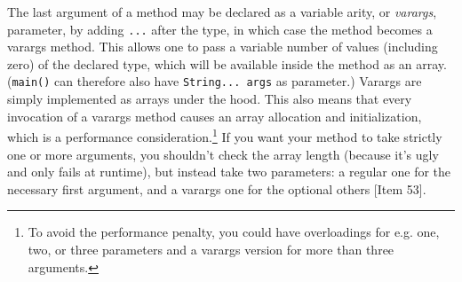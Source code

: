 \documentclass[8pt, table, xcdraw]{article}%
\begin{document}
The last argument of a method may be declared as a variable arity, or \emph{varargs}, parameter, by adding \lstinline{...} after the type, in which case the method becomes a varargs method. This allows one to pass a variable number of values (including zero) of the declared type, which will be available inside the method as an array. (\lstinline{main()} can therefore also have \lstinline{String... args} as parameter.) Varargs are simply implemented as arrays under the hood. This also means that every invocation of a varargs method causes an array allocation and initialization, which is a performance consideration.\footnote{To avoid the performance penalty, you could have overloadings for e.g. one, two, or three parameters and a varargs version for more than three arguments.} If you want your method to take strictly one or more arguments, you shouldn't check the array length (because it's ugly and only fails at runtime), but instead take two parameters: a regular one for the necessary first argument, and a varargs one for the optional others [Item 53].
\end{document}
